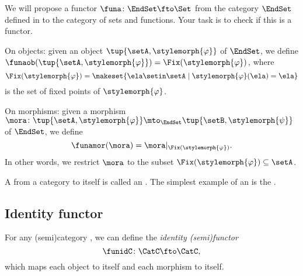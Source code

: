 
\begin{gradedexercise}
    \label{ex:fixed-point-functor}

    We will propose a functor $\funa \colon \EndSet \fto \Set$ from the category $\EndSet$ defined in  to the category of sets and functions.
    Your task is to check if this is a functor.

    On objects: given an object $\tup{\setA, \stylemorph{\varphi}}$ of $\EndSet$, we define $\funaob( \tup{\setA, \stylemorph{\varphi}}) = \Fix(\stylemorph{\varphi})$, where
    \begin{equation}
        \Fix(\stylemorph{\varphi}) = \makeset{\ela \setin \setA \mid \stylemorph{\varphi}(\ela) = \ela}
    \end{equation}
    is the set of fixed points of $\stylemorph{\varphi}$.

    On morphisms: given a morphism $\mora \colon \tup{\setA, \stylemorph{\varphi}} \mto_\EndSet \tup{\setB, \stylemorph{\psi}}$ of $\EndSet$, we define
    \begin{equation}
        \funamor(\mora) = \mora \vert_{\Fix(\stylemorph{\varphi})}.
    \end{equation}
    In other words, we restrict $\mora$ to the subset $\Fix(\stylemorph{\varphi}) \subseteq \setA$.

\end{gradedexercise}


A  from a category to itself is called an .
The simplest example of an  is the .

\subsection{Identity functor}
\label{sec:identity-functor}

\begin{definition}\label{def:identity-semifunctor}
    For any (semi)category \CatC, we can define the \emph{identity (semi)functor}
    \begin{equation}
        \funidC \colon \CatC \fto \CatC,
    \end{equation}
    which maps each object to itself and each morphism to itself.
\end{definition}

